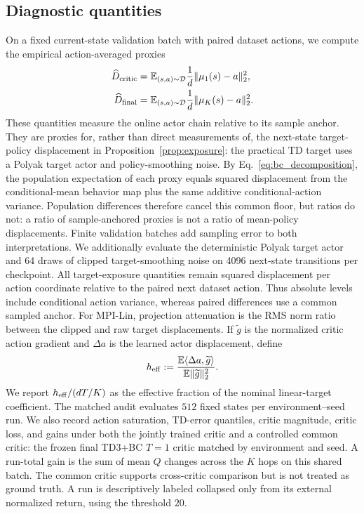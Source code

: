 \subsection{Diagnostic quantities}
On a fixed current-state validation batch with paired dataset actions, we
compute the empirical action-averaged proxies
\[
\begin{aligned}
\widehat D_{\rm critic}
&=\mathbb E_{(s,a)\sim\mathcal D}\frac{1}{d}\|\mu_1(s)-a\|_2^2,\\
\widehat D_{\rm final}
&=\mathbb E_{(s,a)\sim\mathcal D}\frac{1}{d}\|\mu_K(s)-a\|_2^2.
\end{aligned}
\]
These quantities measure the online actor chain relative to its sample anchor.
They are proxies for, rather than direct measurements of, the next-state
target-policy displacement in Proposition~\ref{prop:exposure}: the practical
TD target uses a Polyak target actor and policy-smoothing noise.
By Eq.~\eqref{eq:bc_decomposition}, the population expectation of each proxy
equals squared displacement from the conditional-mean behavior map plus the
same additive conditional-action variance. Population differences therefore
cancel this common floor, but ratios do not: a ratio of sample-anchored proxies
is not a ratio of mean-policy displacements. Finite validation batches add
sampling error to both interpretations.
We additionally evaluate the deterministic Polyak target actor and 64 draws
of clipped target-smoothing noise on 4096 next-state transitions per
checkpoint. All target-exposure quantities remain squared displacement per
action coordinate relative to the paired next dataset action. Thus absolute
levels include conditional action variance, whereas paired differences use a
common sampled anchor.
For MPI-Lin, projection attenuation is the RMS norm ratio between the clipped
and raw target displacements. If $\widetilde g$ is the normalized critic action
gradient and $\Delta a$ is the learned actor displacement, define
\[
h_{\rm eff}:=
\frac{\mathbb E\langle\Delta a,\widetilde g\rangle}
{\mathbb E\|\widetilde g\|_2^2}.
\]
We report $h_{\rm eff}/(dT/K)$ as the effective fraction of the nominal
linear-target coefficient. The matched audit evaluates $512$ fixed states per environment--seed run. We also record action saturation, TD-error quantiles, critic magnitude, critic loss, and gains under both the jointly trained critic and a controlled common critic: the frozen final TD3+BC $T=1$ critic matched by environment and seed. A run-total gain is the sum of mean $Q$ changes across the $K$ hops on this shared batch. The common critic supports cross-critic comparison but is not treated as ground truth. A run is descriptively labeled collapsed only from its external normalized return, using the threshold $20$.

